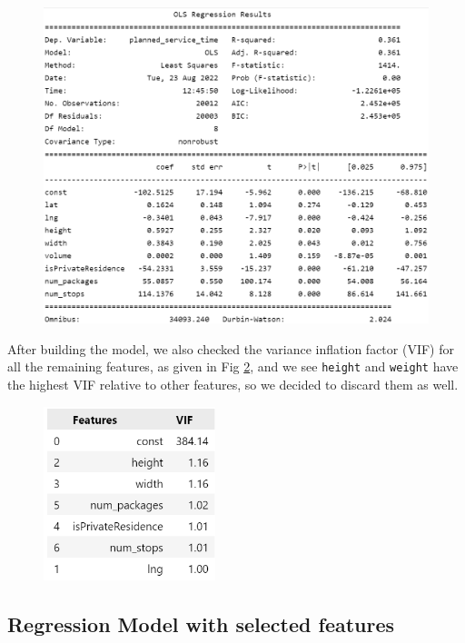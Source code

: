\documentclass[12pt]{article}
\theoremstyle{plain}
\numberwithin{equation}{section}
\begin{document}
\begin{figure}
\centering
\includegraphics[width=14cm]{Images/reg1.png}
\caption{}
\label{fig:reg1}
\end{figure}


After building the model, we also checked the variance inflation factor (VIF) for all the remaining features, as given in Fig \ref{fig:VIF}, and we see \texttt{height} and \texttt{weight} have the highest VIF relative to other features, so we decided to discard them as well.

\begin{figure}
\centering
\includegraphics[width=5cm]{Images/VIF.png}
\caption{}
\label{fig:VIF}
\end{figure}

\subsection{Regression Model with selected features}
\end{document}
